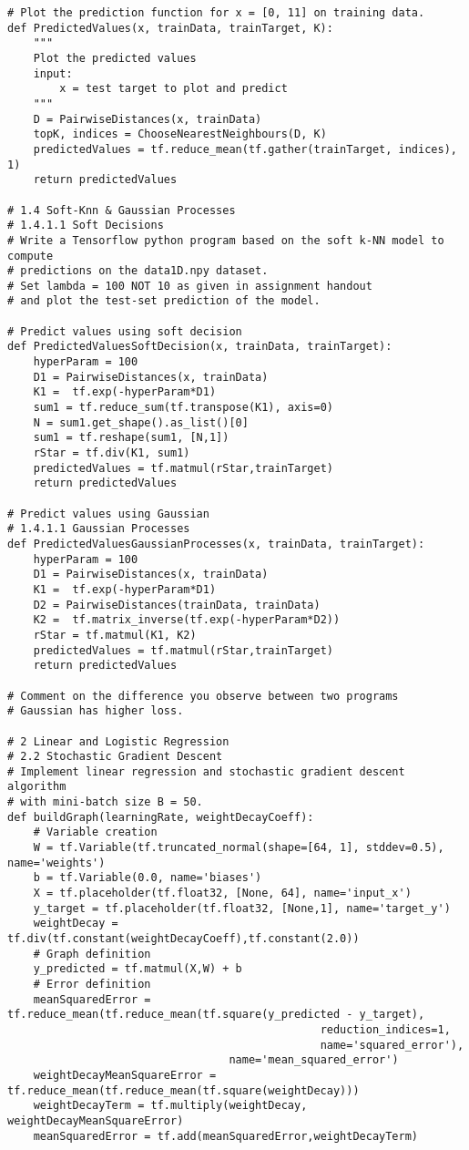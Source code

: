 \documentclass[a4paper,12pt]{article}
\begin{document}
\begin{verbatim}
# Plot the prediction function for x = [0, 11] on training data.
def PredictedValues(x, trainData, trainTarget, K):
    """
    Plot the predicted values
    input:
        x = test target to plot and predict
    """
    D = PairwiseDistances(x, trainData)
    topK, indices = ChooseNearestNeighbours(D, K)
    predictedValues = tf.reduce_mean(tf.gather(trainTarget, indices), 1)
    return predictedValues

# 1.4 Soft-Knn & Gaussian Processes
# 1.4.1.1 Soft Decisions
# Write a Tensorflow python program based on the soft k-NN model to compute 
# predictions on the data1D.npy dataset. 
# Set lambda = 100 NOT 10 as given in assignment handout
# and plot the test-set prediction of the model. 

# Predict values using soft decision
def PredictedValuesSoftDecision(x, trainData, trainTarget):
    hyperParam = 100
    D1 = PairwiseDistances(x, trainData)
    K1 =  tf.exp(-hyperParam*D1)
    sum1 = tf.reduce_sum(tf.transpose(K1), axis=0)
    N = sum1.get_shape().as_list()[0]
    sum1 = tf.reshape(sum1, [N,1])
    rStar = tf.div(K1, sum1)
    predictedValues = tf.matmul(rStar,trainTarget)
    return predictedValues

# Predict values using Gaussian
# 1.4.1.1 Gaussian Processes
def PredictedValuesGaussianProcesses(x, trainData, trainTarget):
    hyperParam = 100
    D1 = PairwiseDistances(x, trainData)
    K1 =  tf.exp(-hyperParam*D1)
    D2 = PairwiseDistances(trainData, trainData)
    K2 =  tf.matrix_inverse(tf.exp(-hyperParam*D2))
    rStar = tf.matmul(K1, K2)
    predictedValues = tf.matmul(rStar,trainTarget)
    return predictedValues

# Comment on the difference you observe between two programs
# Gaussian has higher loss. 

# 2 Linear and Logistic Regression
# 2.2 Stochastic Gradient Descent
# Implement linear regression and stochastic gradient descent algorithm 
# with mini-batch size B = 50.
def buildGraph(learningRate, weightDecayCoeff):
    # Variable creation
    W = tf.Variable(tf.truncated_normal(shape=[64, 1], stddev=0.5), name='weights')
    b = tf.Variable(0.0, name='biases')
    X = tf.placeholder(tf.float32, [None, 64], name='input_x')
    y_target = tf.placeholder(tf.float32, [None,1], name='target_y')
    weightDecay = tf.div(tf.constant(weightDecayCoeff),tf.constant(2.0))
    # Graph definition
    y_predicted = tf.matmul(X,W) + b 
    # Error definition
    meanSquaredError = tf.reduce_mean(tf.reduce_mean(tf.square(y_predicted - y_target), 
                                                reduction_indices=1, 
                                                name='squared_error'), 
                                  name='mean_squared_error')
    weightDecayMeanSquareError = tf.reduce_mean(tf.reduce_mean(tf.square(weightDecay)))
    weightDecayTerm = tf.multiply(weightDecay, weightDecayMeanSquareError)
    meanSquaredError = tf.add(meanSquaredError,weightDecayTerm)


\end{verbatim}
\end{document}
